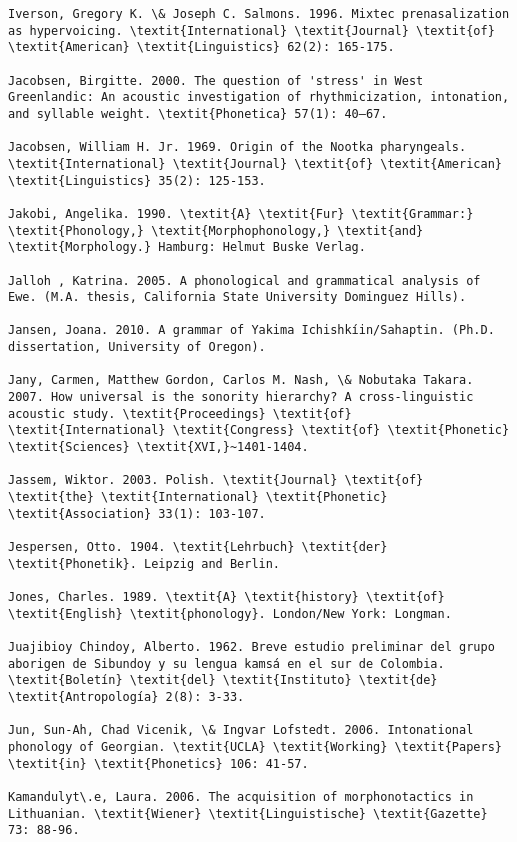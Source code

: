 \begin{verbatim}
Iverson, Gregory K. \& Joseph C. Salmons. 1996. Mixtec prenasalization as hypervoicing. \textit{International} \textit{Journal} \textit{of} \textit{American} \textit{Linguistics} 62(2): 165-175.

Jacobsen, Birgitte. 2000. The question of 'stress' in West Greenlandic: An acoustic investigation of rhythmicization, intonation, and syllable weight. \textit{Phonetica} 57(1): 40–67.

Jacobsen, William H. Jr. 1969. Origin of the Nootka pharyngeals. \textit{International} \textit{Journal} \textit{of} \textit{American} \textit{Linguistics} 35(2): 125-153.

Jakobi, Angelika. 1990. \textit{A} \textit{Fur} \textit{Grammar:} \textit{Phonology,} \textit{Morphophonology,} \textit{and} \textit{Morphology.} Hamburg: Helmut Buske Verlag.

Jalloh , Katrina. 2005. A phonological and grammatical analysis of Ewe. (M.A. thesis, California State University Dominguez Hills).

Jansen, Joana. 2010. A grammar of Yakima Ichishkíin/Sahaptin. (Ph.D. dissertation, University of Oregon).

Jany, Carmen, Matthew Gordon, Carlos M. Nash, \& Nobutaka Takara. 2007. How universal is the sonority hierarchy? A cross-linguistic acoustic study. \textit{Proceedings} \textit{of} \textit{International} \textit{Congress} \textit{of} \textit{Phonetic} \textit{Sciences} \textit{XVI,}~1401-1404.

Jassem, Wiktor. 2003. Polish. \textit{Journal} \textit{of} \textit{the} \textit{International} \textit{Phonetic} \textit{Association} 33(1): 103-107.

Jespersen, Otto. 1904. \textit{Lehrbuch} \textit{der} \textit{Phonetik}. Leipzig and Berlin.

Jones, Charles. 1989. \textit{A} \textit{history} \textit{of} \textit{English} \textit{phonology}. London/New York: Longman.

Juajibioy Chindoy, Alberto. 1962. Breve estudio preliminar del grupo aborigen de Sibundoy y su lengua kamsá en el sur de Colombia. \textit{Boletín} \textit{del} \textit{Instituto} \textit{de} \textit{Antropología} 2(8): 3-33.

Jun, Sun-Ah, Chad Vicenik, \& Ingvar Lofstedt. 2006. Intonational phonology of Georgian. \textit{UCLA} \textit{Working} \textit{Papers} \textit{in} \textit{Phonetics} 106: 41-57.

Kamandulyt\.e, Laura. 2006. The acquisition of morphonotactics in Lithuanian. \textit{Wiener} \textit{Linguistische} \textit{Gazette} 73: 88-96.


\end{verbatim}
